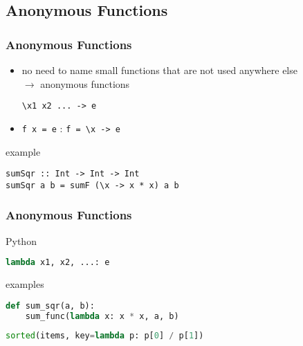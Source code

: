 \documentclass[dvipsnames]{beamer}
\theoremstyle{plain}
\begin{document}
\subsection{Anonymous Functions}

\begin{frame}[fragile]
  \frametitle{Anonymous Functions}

  \begin{itemize}
    \item no need to name small functions that are not used anywhere else\\
      $\rightarrow$ \alert{anonymous} functions
    \begin{lstlisting}[style=syntax]
\x1 x2 ... -> e
    \end{lstlisting}
    \item \lstinline|f x = e| \hspace{36pt} : \hspace{36pt} \lstinline|f = \x -> e|
  \end{itemize}

  \pause
  \medskip
  \begin{exampleblock}{example}
    \begin{lstlisting}
sumSqr :: Int -> Int -> Int
sumSqr a b = sumF (\x -> x * x) a b
    \end{lstlisting}
  \end{exampleblock}
\end{frame}

\begin{frame}[fragile]
  \frametitle{Anonymous Functions}

  \begin{block}{Python}
    \begin{lstlisting}[language=Python, style=syntax]
lambda x1, x2, ...: e
    \end{lstlisting}
  \end{block}

  \medskip
  \begin{exampleblock}{examples}
    \begin{lstlisting}[language=Python]
def sum_sqr(a, b):
    sum_func(lambda x: x * x, a, b)
    \end{lstlisting}

    \pause
    \bigskip
    \begin{lstlisting}[language=Python]
sorted(items, key=lambda p: p[0] / p[1])
    \end{lstlisting}
  \end{exampleblock}
\end{frame}
\end{document}
